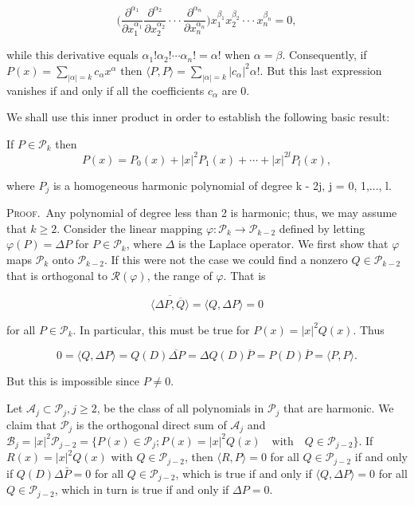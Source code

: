 \[
\biggl(\frac{\partial^{\alpha_{1}}}{\partial x_{1}^{\alpha_{1}}}\frac{\partial^{\alpha_{2}}}{\partial x_{2}^{\alpha_{2}}}\cdot\cdot\cdot\frac{\partial^{\alpha_{n}}}{\partial x_{n}^{\alpha_{n}}}\biggr)x_{1}^{\beta_{1}}x_{2}^{\beta_{2}}\cdot\cdot\cdot x_{n}^{\beta_{n}}=0,
\]

while this derivative equals $\alpha_1! \alpha_2! \cdots \alpha_n! = \alpha!$ when $\alpha = \beta$. Consequently, if $P(x) = \sum_{|\alpha| = k} c_\alpha x^\alpha$ then $\langle P, P \rangle = \sum_{|\alpha| = k} |c_\alpha|^2 \alpha!$. But this last expression vanishes if and only if all the coefficients $c_\alpha$ are 0.

We shall use this inner product in order to establish the following basic result:

\begin{theorem}
\label{thm:c4-2-1}
If $P \in \mathcal{P}_k$ then
\[
P(x)=P_{0}(x)+\left|x\right|^{2}P_{1}(x)+\cdots+\left|x\right|^{2l}P_{l}(x),
\]

where $P_j$ is a homogeneous harmonic polynomial of degree k - 2j, j = 0, 1,..., l.
\end{theorem}

\textsc{Proof.}\ Any polynomial of degree less than 2 is harmonic; thus, we may assume that $k \geq 2$. Consider the linear mapping $\varphi: \mathcal{P}_k \to \mathcal{P}_{k-2}$ defined by letting $\varphi(P) = \Delta P$ for $P \in \mathcal{P}_k$, where $\Delta$ is the Laplace operator. We first show that $\varphi$ maps $\mathcal{P}_k$ onto $\mathcal{P}_{k-2}$. If this were not the case we could find a nonzero $Q \in \mathcal{P}_{k-2}$ that is orthogonal to $\mathcal{R}(\varphi)$, the range of $\varphi$. That is

\[
\overline{\langle\Delta P,\overline{Q}\rangle}=\langle Q,\Delta P\rangle=0
\]

for all $P \in \mathcal{P}_k$. In particular, this must be true for $P(x) = |x|^2 Q(x)$. Thus

\[
0=\langle Q,\Delta P\rangle=Q(D)\overline{{\Delta P}}=\Delta Q(D)\overline{{P}}=P(D)\overline{{P}}=\langle P,P\rangle.
\]

But this is impossible since $P \neq 0$.

Let $\mathcal{A}_j \subset \mathcal{P}_j, j \geq 2$, be the class of all polynomials in $\mathcal{P}_j$ that are harmonic. We claim that $\mathcal{P}_j$ is the orthogonal direct sum of $\mathcal{A}_j$ and $\mathcal{B}_j = |x|^2 \mathcal{P}_{j-2} = \{P(x) \in \mathcal{P}_j; P(x) = |x|^2 Q(x) \quad \text{with} \quad Q \in \mathcal{P}_{j-2}\}$. If $R(x) = |x|^2 Q(x)$ with $Q \in \mathcal{P}_{j-2}$, then $\langle R, P \rangle = 0$ for all $Q \in \mathcal{P}_{j-2}$ if and only if $Q(D) \Delta \bar{P} = 0$ for all $Q \in \mathcal{P}_{j-2}$, which is true if and only if $\langle Q, \Delta P \rangle = 0$ for all $Q \in \mathcal{P}_{j-2}$, which in turn is true if and only if $\Delta P = 0$.

